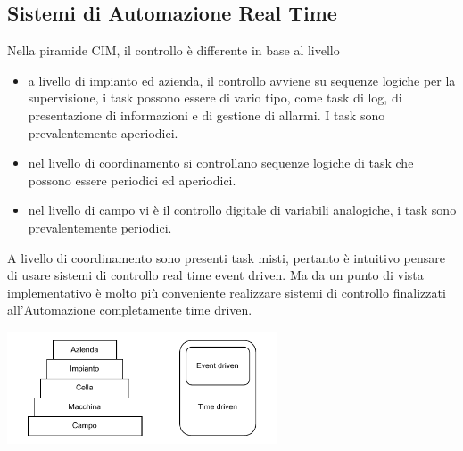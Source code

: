 \documentclass[10pt, letterpaper]{report}
\begin{document}
\subsection{Sistemi di Automazione Real Time}
Nella piramide CIM, il controllo è differente in base al livello \begin{itemize}
    \item a livello di impianto ed azienda, il controllo avviene su sequenze logiche per la supervisione, i task possono essere di vario tipo, come task di log, di presentazione di informazioni e di gestione di allarmi.  I task sono prevalentemente aperiodici.
    \item nel livello di coordinamento si controllano sequenze logiche di task che possono essere periodici ed aperiodici.
    \item nel livello di campo vi è il controllo digitale di variabili analogiche, i task sono prevalentemente periodici.
\end{itemize}
A livello di coordinamento sono presenti task misti, pertanto è
intuitivo pensare di usare sistemi di controllo real time event driven.
Ma da un punto di vista implementativo è molto più conveniente realizzare sistemi
di controllo finalizzati all'Automazione completamente time driven.
\begin{center}
    \includegraphics[width=0.6\textwidth ]{images/cim3.pdf}
\end{center}\flowerLine 
\end{document}
